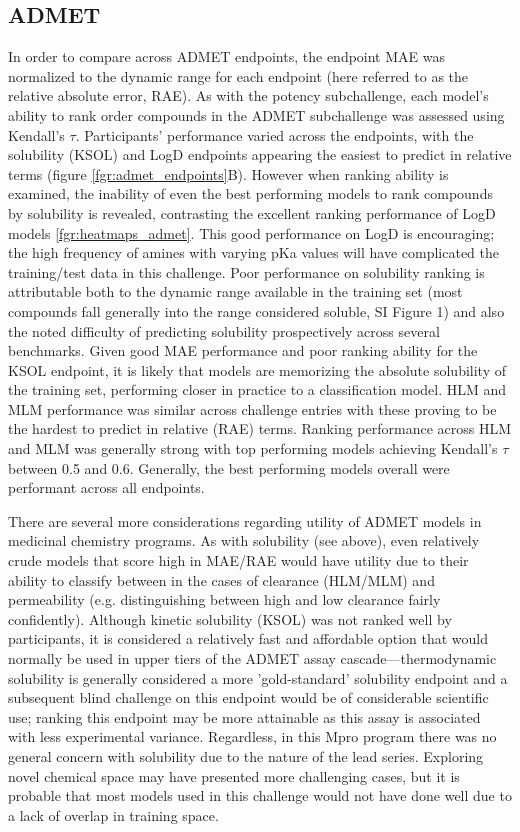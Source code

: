 \documentclass[journal=jcim,manuscript=article]{achemso}
\begin{document}
\subsection{ADMET}
In order to compare across ADMET endpoints, the endpoint MAE was normalized to the dynamic range for each endpoint (here referred to as the relative absolute error, RAE). As with the potency subchallenge, each model's ability to rank order compounds in the ADMET subchallenge was assessed using Kendall's $\tau$. Participants' performance varied across the endpoints, with the solubility (KSOL) and LogD endpoints appearing the easiest to predict in relative terms (figure \ref{fgr:admet_endpoints}B). However when ranking ability is examined, the inability of even the best performing models to rank compounds by solubility is revealed, contrasting the excellent ranking performance of LogD models \ref{fgr:heatmaps_admet}. This good performance on LogD is encouraging; the high frequency of amines with varying pKa values will have complicated the training/test data in this challenge. Poor performance on solubility ranking is attributable both to the dynamic range available in the training set (most compounds fall generally into the range considered soluble, SI Figure 1) and also the noted difficulty of predicting solubility prospectively across several benchmarks\cite{llompart_minoletti_baybekov_horvath_marcou_varnek_2024}. Given good MAE performance and poor ranking ability for the KSOL endpoint, it is likely that models are memorizing the absolute solubility of the training set, performing closer in practice to a classification model. HLM and MLM performance was similar across challenge entries with these proving to be the hardest to predict in relative (RAE) terms. Ranking performance across HLM and MLM was generally strong with top performing models achieving Kendall's $\tau$ between 0.5 and 0.6. Generally, the best performing models overall were performant across all endpoints.

There are several more considerations regarding utility of ADMET models in medicinal chemistry programs. As with solubility (see above), even relatively crude models that score high in MAE/RAE would have utility due to their ability to classify between in the cases of clearance (HLM/MLM) and permeability (e.g. distinguishing between high and low clearance fairly confidently). Although kinetic solubility (KSOL) was not ranked well by participants, it is considered a relatively fast and affordable option that would normally be used in upper tiers of the ADMET assay cascade---thermodynamic solubility is generally considered a more 'gold-standard' solubility endpoint and a subsequent blind challenge on this endpoint would be of considerable scientific use; ranking this endpoint may be more attainable as this assay is associated with less experimental variance.\cite{llompart_minoletti_baybekov_horvath_marcou_varnek_2024} Regardless, in this Mpro program there was no general concern with solubility due to the nature of the lead series. Exploring novel chemical space may have presented more challenging cases, but it is probable that most models used in this challenge would not have done well due to a lack of overlap in training space.
\end{document}
